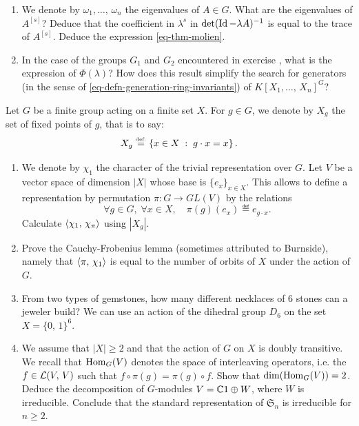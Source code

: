 \begin{exo}
\begin{enumerate}
\item We denote by $ \omega_1, \ldots, \, \omega_n $ the eigenvalues of $ A \in G $. What are the eigenvalues of $ A^{[s]} $? Deduce that the coefficient in $ \lambda^s $ in $ \det (\operatorname{Id} - \lambda A)^{-1} $ is equal to the trace of $ A^{[s]} $. Deduce the expression \eqref{eq-thm-molien}.
\item In the case of the groups $ G_1 $ and $ G_2 $ encountered in exercise , what is the expression of $ \Phi (\lambda) $? How does this result simplify the search for generators (in the sense of \eqref{eq-defn-generation-ring-invariants}) of $ K[X_1, \ldots, \, X_n]^G $?
\end{enumerate}
\end{exo}
 
 
\begin{exo}
\label{exo-lemma-cauchy-frobenius}
 
   Let $G$ be a finite group acting on a finite set $ X $. For $ g \in G $, we denote by $ X_g $ the set of fixed points of $ g $, that is to say:
\begin{equation*}
X_g \stackrel{\mbox{\upshape\tiny def.}}{=} \left\{ x \in X \;:\; g \cdot x = x \right\}.
\end{equation*}
\begin{enumerate}
\item We denote by $ \chi_1 $ the character of the trivial representation over $G$. Let $V$ be a vector space of dimension $ | X | $ whose base is $ \{e_x\}_{x \in X} $. This allows to define a representation by permutation $ \pi: G \rightarrow GL (V) $ by the relations
\begin{equation*}
\forall g \in G, \; \forall x \in X, \quad \pi (g) (e_x) \eqdef e_{g \cdot x}.
\end{equation*}
Calculate $ \langle \chi_1,\,\chi_\pi\rangle $ using $ | X_g | $.
\item {}  Prove the Cauchy-Frobenius lemma (sometimes attributed to Burnside), namely that $ \langle \pi,\, \chi_1\rangle $ is equal to the number of orbits of $ X $ under the action of $G$.
\item {} From two types of gemstones, how many different necklaces of 6 stones can a jeweler build? We can use an action of the dihedral group $ D_6 $ on the set $ X = \{0, \, 1\}^6 $.
\item {}  We assume that $ | X | \geq 2 $ and that the action of $G$ on $ X $ is doubly transitive. We recall that $ \operatorname{Hom}_G (V) $ denotes the space of interleaving operators, i.e. the $ f \in \mathcal{L} (V, \, V) $ such that $ f \circ \pi (g) = \pi (g) \circ f $. Show that $ \dim (\operatorname{Hom}_G (V)) = 2 $. Deduce the decomposition of $G$-modules $ V = \mathbb{C} 1 \oplus W $, where $ W $ is irreducible. Conclude that the standard representation of $ \mathfrak{S}_n $ is irreducible for $ n \geq 2 $.
\end{enumerate}
\end{exo}
 
